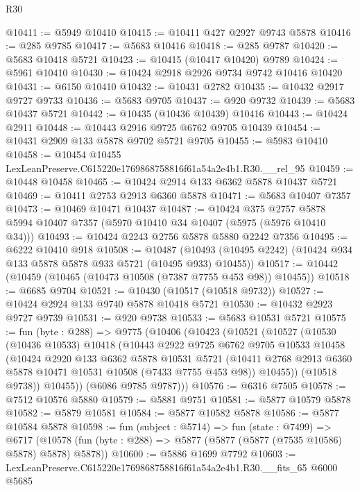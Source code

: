 \begin{lexlean}{R30}
\begin{coremodule}
@10411 := @5949 @10410
@10415 := @10411 @427 @2927 @9743 @5878
@10416 := @285 @9785
@10417 := @5683 @10416
@10418 := @285 @9787
@10420 := @5683 @10418 @5721
@10423 := @10415 (@10417 @10420) @9789
@10424 := @5961 @10410
@10430 := @10424 @2918 @2926 @9734 @9742 @10416 @10420
@10431 := @6150 @10410
@10432 := @10431 @2782
@10435 := @10432 @2917 @9727 @9733
@10436 := @5683 @9705
@10437 := @920 @9732
@10439 := @5683 @10437 @5721
@10442 := @10435 (@10436 @10439) @10416
@10443 := @10424 @2911
@10448 := @10443 @2916 @9725 @6762 @9705 @10439
@10454 := @10431 @2909 @133 @5878 @9702 @5721 @9705
@10455 := @5983 @10410
@10458 := @10454 @10455 LexLeanPreserve.C615220e1769868758816f61a54a2e4b1.R30.__rel_95
@10459 := @10448 @10458
@10465 := @10424 @2914 @133 @6362 @5878 @10437 @5721
@10469 := @10411 @2753 @2913 @6360 @5878
@10471 := @5683 @10407 @7357
@10473 := @10469 @10471 @10437
@10487 := @10424
    @375
    @2757
    @5878
    @5994
    @10407
    @7357
    (@5970 @10410 @34 @10407 (@5975 (@5976 @10410 @34)))
@10493 := @10424 @2243 @2756 @5878 @5880 @2242 @7356
@10495 := @6222 @10410 @918
@10508 := @10487
    (@10493 (@10495 @2242) (@10424 @934 @133 @5878 @5878 @933 @5721 (@10495 @933) @10455))
@10517 := @10442 (@10459 (@10465 (@10473 @10508 (@7387 @7755 @453 @98)) @10455))
@10518 := @6685 @9704
@10521 := @10430 (@10517 (@10518 @9732))
@10527 := @10424 @2924 @133 @9740 @5878 @10418 @5721
@10530 := @10432 @2923 @9727 @9739
@10531 := @920 @9738
@10533 := @5683 @10531 @5721
@10575 := fun (byte : @288) =>
  @9775
    (@10406
      (@10423
        (@10521
          (@10527
            (@10530
              (@10436 @10533)
              @10418
              (@10443
                @2922
                @9725
                @6762
                @9705
                @10533
                @10458
                (@10424
                  @2920
                  @133
                  @6362
                  @5878
                  @10531
                  @5721
                  (@10411 @2768 @2913 @6360 @5878 @10471 @10531 @10508 (@7433 @7755 @453 @98))
                  @10455))
              (@10518 @9738))
            @10455))
        (@6086 @9785 @9787)))
@10576 := @6316 @7505
@10578 := @7512 @10576 @5880
@10579 := @5881 @9751
@10581 := @5877 @10579 @5878
@10582 := @5879 @10581
@10584 := @5877 @10582 @5878
@10586 := @5877 @10584 @5878
@10598 := fun (subject : @5714) =>
  fun (state : @7499) =>
  @6717 (@10578 (fun (byte : @288) => @5877 (@5877 (@5877 (@7535 @10586) @5878) @5878) @5878))
@10600 := @5886 @1699 @7792
@10603 := LexLeanPreserve.C615220e1769868758816f61a54a2e4b1.R30.__fits_65 @6000 @5685

\end{coremodule}
\end{lexlean}
